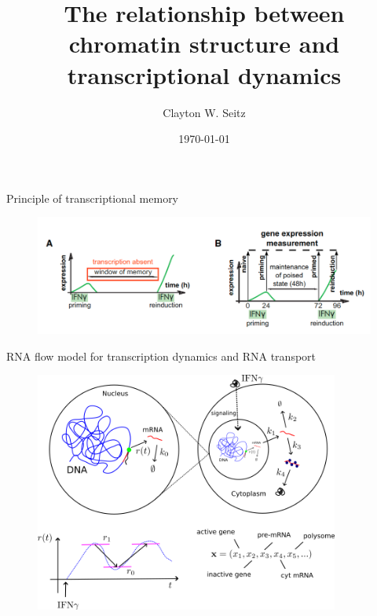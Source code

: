 \documentclass[aspectratio=1610]{beamer}					%
\title{The relationship between chromatin structure and transcriptional dynamics}	%
\author{Clayton W. Seitz}								%
\date{\today}									%
\begin{document}
\begin{frame}
  \titlepage
\end{frame}


%


\begin{frame}{Principle of transcriptional memory}
\begin{figure}
\includegraphics[width=14cm]{Memory.png}
\end{figure}
\end{frame}

\begin{frame}{RNA flow model for transcription dynamics and RNA transport}
\begin{figure}
\includegraphics[width=10cm]{RNAFlow.png}
\end{figure}
\end{frame}
\end{document}
